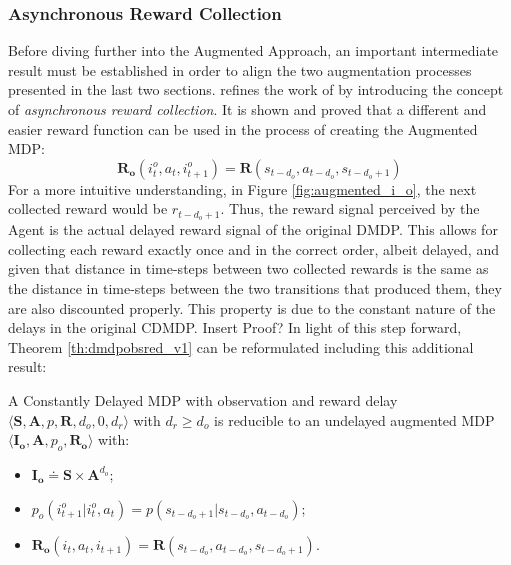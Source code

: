             \subsubsection{Asynchronous Reward Collection}
                Before diving further into the Augmented Approach, an important intermediate result must be established in order to align the two augmentation processes presented in the last two sections.  refines the work of  by introducing the concept of \textit{asynchronous reward collection}. It is shown and proved that a different and easier reward function can be used in the process of creating the Augmented MDP:
                \[ \mathbf{R_{o}}\left( i^o_t, a_{t}, i^o_{t+1} \right) = \mathbf{R}\left(s_{t-d_{o}}, a_{t-d_{o}}, s_{t-d_{o}+1} \right)\]
                For a more intuitive understanding, in Figure \ref{fig:augmented_i_o}, the next collected reward would be $r_{t-d_{o}+1}$. Thus, the reward signal perceived by the Agent is the actual delayed reward signal of the original DMDP. This allows for collecting each reward exactly once and in the correct order, albeit delayed, and given that distance in time-steps between two collected rewards is the same as the distance in time-steps between the two transitions that produced them, they are also discounted properly. This property is due to the constant nature of the delays in the original CDMDP. \color{red} Insert Proof? \color{black} \newline
                In light of this step forward, Theorem \ref{th:dmdpobsred_v1} can be reformulated including this additional result:
                
                \begin{theorem}
                    \label{th:dmdpobsred_v2}
                    A Constantly Delayed MDP with observation and reward delay $\langle \mathbf{S}, \mathbf{A}, p, \mathbf{R}, d_o, 0, d_r \rangle$ with $d_r \geq d_o$ is reducible to an undelayed augmented MDP $\langle \mathbf{I_o}, \mathbf{A}, p_o, \mathbf{R_o} \rangle$ with: 
                    \begin{itemize}[topsep=0.5em, partopsep=0.5em]
                        \setlength\itemsep{0em}
                        \item $\mathbf{I_{o}} \doteq \mathbf{S} \times \mathbf{A}^{d_o}$;
                        \item $p_o \left( i_{t+1}^o | i_t^o , a_t  \right) = p ( s_{t-d_{o}+1} | s_{t-d_{o}}, a_{t-d_{o}})$;
                        \item $\mathbf{R_{o}}\left( i_t, a_{t}, i_{t+1} \right) = \mathbf{R}\left(s_{t-d_{o}}, a_{t-d_{o}}, s_{t-d_{o}+1} \right)$.
                    \end{itemize}
                \end{theorem}
                
